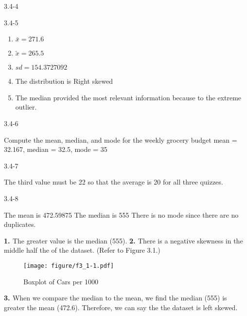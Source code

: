 \begin{exsol@solution}{3.4-4}


\end{exsol@solution}
\begin{exsol@solution}{3.4-5}

\begin{enumerate}
\item $\bar{x} = 271.6$
\item $\tilde{x} = 265.5$
\item $sd = 154.3727092 $
\item The distribution is Right skewed
\item The median provided the most relevant information because to the extreme outlier.
\end{enumerate}

\end{exsol@solution}
\begin{exsol@solution}{3.4-6}
	
	Compute the mean, median, and mode for the weekly grocery budget
	mean = 32.167, median = 32.5, mode = 35
	
\end{exsol@solution}
\begin{exsol@solution}{3.4-7}
	
	The third value must be 22 so that the average is 20 for all three quizzes.
	
\end{exsol@solution}
\begin{exsol@solution}{3.4-8}




    The mean is 472.59875
    The median is 555
    There is no mode since there are no duplicates.

{\bf{1. }} The greater value is the median (555).  {\bf{2. }} There is a negative skewness in the middle half the of the dataset.  (Refer to Figure 3.1.)

\begin{figure}[htbp] %
   \centering
   \texttt{[image: figure/f3\_1-1.pdf]}
   \caption{Boxplot of Cars per 1000}
   \label{fig:f3_1}
\end{figure}

{\bf{3. }} When we compare the median to the mean, we find the median (555) is greater the mean (472.6).  Therefore, we can say the the dataset is left skewed.

\end{exsol@solution}
